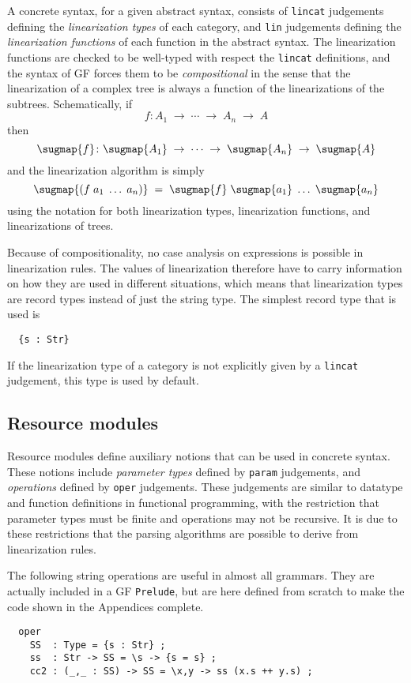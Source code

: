 \documentclass[12pt]{article}
\newcommand{\empha}[1]{{\em #1}}
\newcommand{\rarrow}{\; \rightarrow\;}
\begin{document}
A concrete syntax, for a given abstract syntax, 
consists of \texttt{lincat} judgements
defining the \empha{linearization types} of each category,
and \texttt{lin} judgements
defining the \empha{linearization functions} of each function
in the abstract syntax. The linearization functions are
checked to be well-typed with respect the \texttt{lincat}
definitions, and the syntax of GF forces them to be \empha{compositional}
in the sense that the linearization of a complex tree is always
a function of the linearizations of the subtrees. Schematically, if
\[
  f \colon A_{1} \rarrow \cdots \rarrow A_{n} \rarrow A 
\]
then
\[
  \sugmap{f} \colon 
    \sugmap{A_{1}} \rarrow \cdots 
    \rarrow \sugmap{A_{n}} \rarrow \sugmap{A} 
\]
and the linearization algorithm is simply
\[
  \sugmap{(f \; a_{1} \; \ldots \; a_{n})} \; = \;
   \sugmap{f} \; \sugmap{a_{1}} \; \ldots \; \sugmap{a_{n}}
\]
using the \sugmap{} notation for both linearization types, 
linearization functions, and linearizations of trees.

Because of compositionality, no case analysis on expressions
is possible in linearization rules. The values of linearization
therefore have to carry information on how they are used in
different situations, which means that linearization
types are record types instead of just the string type.
The simplest record type that is used is
\begin{verbatim}
  {s : Str}
\end{verbatim}
If the linearization type of a category is not explicitly
given by a \texttt{lincat} judgement, this type is
used by default. 



\subsection{Resource modules}

Resource modules define auxiliary notions that can be
used in concrete syntax. These notions include
\empha{parameter types} defined by \texttt{param}
judgements, and \empha{operations} defined by
\texttt{oper} judgements. These judgements are
similar to datatype and function definitions
in functional programming, with the restriction
that parameter types must be finite and operations
may not be recursive. It is due to these restrictions that
the parsing algorithms are possible to derive from
linearization rules.

The following string operations are useful in almost
all grammars. They are actually included in a GF \texttt{Prelude},
but are here defined from scratch to make the code shown in
the Appendices complete.
\begin{verbatim}
  oper
    SS  : Type = {s : Str} ;
    ss  : Str -> SS = \s -> {s = s} ;
    cc2 : (_,_ : SS) -> SS = \x,y -> ss (x.s ++ y.s) ;
\end{verbatim}
\end{document}
